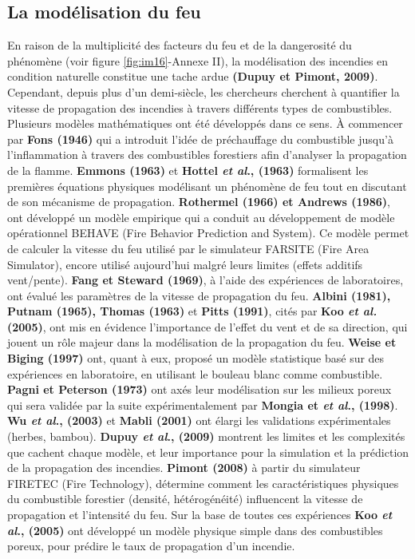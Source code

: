\documentclass[12pt, oneside]{report} %
\theoremstyle{definition}
\theoremstyle{remark}
\begin{document}
		\subsection{La modélisation du feu}
	En raison de la multiplicité des facteurs du feu et de la dangerosité du phénomène (voir figure \ref{fig:im16}-Annexe II), la modélisation des incendies en condition naturelle constitue une tache ardue \textbf{(Dupuy et Pimont, 2009)}. Cependant, depuis plus d’un demi-siècle, les chercheurs cherchent à quantifier la vitesse de propagation des incendies à travers différents types de combustibles. Plusieurs modèles mathématiques ont été développés dans ce sens.
	À commencer par \textbf{Fons (1946)} qui a introduit l'idée de préchauffage du combustible jusqu'à l'inflammation à travers des combustibles forestiers afin d'analyser la propagation de la flamme. \textbf{Emmons (1963)} et \textbf{Hottel \textit{et al}., (1963)} formalisent les premières équations physiques modélisant un phénomène de feu tout en discutant de son mécanisme de propagation. 
	\textbf{Rothermel (1966) et Andrews (1986)}, ont développé un modèle empirique qui a conduit au développement de modèle opérationnel BEHAVE (Fire Behavior Prediction and System). Ce modèle permet de calculer la vitesse du feu utilisé par le simulateur FARSITE (Fire Area Simulator), encore utilisé aujourd'hui malgré leurs limites (effets additifs vent/pente).
	\textbf{Fang et Steward (1969)}, à l'aide des expériences de laboratoires, ont évalué les paramètres de la vitesse de propagation du feu. \textbf{Albini (1981), Putnam (1965), Thomas (1963)} et \textbf{Pitts (1991)}, cités par \textbf{Koo \textit{et al.} (2005)}, ont mis en évidence l'importance de l'effet du vent et de sa direction, qui jouent un rôle majeur dans la modélisation de la propagation du feu.  
	\textbf{Weise et Biging (1997)} ont, quant à eux, proposé un modèle statistique basé sur des expériences en laboratoire, en utilisant le bouleau blanc comme combustible.
	\textbf{Pagni et Peterson (1973)} ont axés leur modélisation sur les milieux poreux qui sera validée par la suite expérimentalement par \textbf{Mongia et \textit{et al}., (1998)}. \textbf{Wu \textit{et al}., (2003)} et \textbf{Mabli (2001)} ont élargi les validations expérimentales (herbes, bambou). \textbf{Dupuy \textit{et al}., (2009)} montrent les limites et les complexités que cachent chaque modèle, et leur importance pour la simulation et la prédiction de la propagation des incendies. \textbf{Pimont (2008)} à partir du simulateur FIRETEC (Fire Technology), détermine comment les caractéristiques physiques du combustible forestier (densité, hétérogénéité) influencent la vitesse de propagation et l'intensité du feu.
	Sur la base de toutes ces expériences \textbf{Koo \textit{et al}., (2005)} ont développé un modèle physique simple dans des combustibles poreux, pour prédire le taux de propagation d'un incendie.
		
\end{document}
